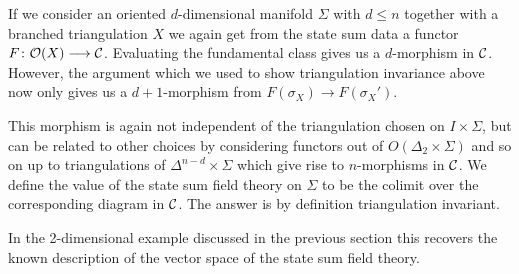 If we consider an oriented $d$-dimensional manifold $\Sigma$ with $d\leq n$ together with a  branched triangulation $X$ we again get from the state sum data a functor $F\colon \mathcal{O}(X)\longrightarrow \mathcal{C}$.
Evaluating the fundamental class gives us a $d$-morphism in
$\mathcal{C}$.
However, the argument which we used to show triangulation invariance above now only gives us a $d+1$-morphism from $F(\sigma_X) \longrightarrow F(\sigma_X')$.

This morphism is again not independent of the triangulation chosen on $I\times \Sigma $, but can be related to other choices by considering functors out of $O(\Delta_2 \times \Sigma)$ and so on up to triangulations of $\Delta^{n-d}\times \Sigma $ which give rise to $n$-morphisms in $\mathcal{C}$.
We define the value of the state sum field theory on $\Sigma$ to be the colimit over the corresponding diagram in $\mathcal{C}$.
The answer is by definition triangulation invariant.


In the 2-dimensional example discussed in the previous section this recovers the known description of the vector space of the state sum field theory.
